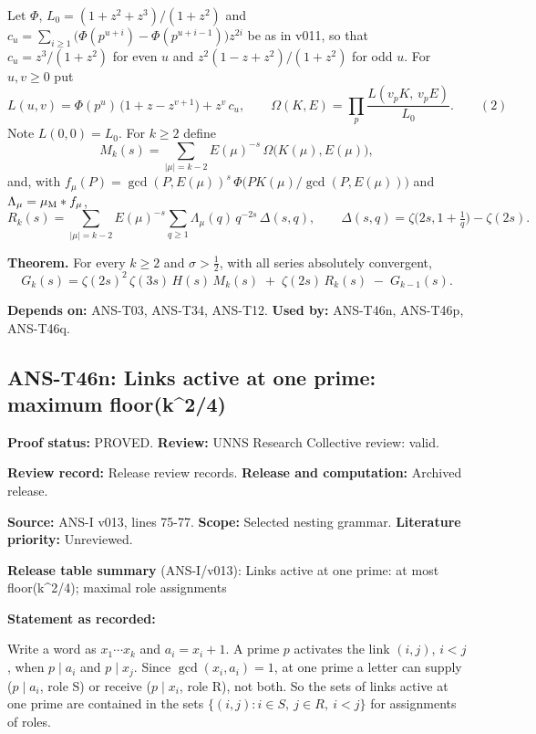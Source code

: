 \documentclass[
  11pt,
]{article}
\begin{document}
Let \(\Phi\), \(L_0=(1+z^2+z^3)/(1+z^2)\) and
\(c_u=\sum_{i\ge1}\big(\Phi(p^{u+i})-\Phi(p^{u+i-1})\big)z^{2i}\) be as
in v011, so that \(c_u=z^3/(1+z^2)\) for even \(u\) and
\(z^2(1-z+z^2)/(1+z^2)\) for odd \(u\). For \(u,v\ge0\) put
\[L(u,v)=\Phi(p^u)\,\big(1+z-z^{v+1}\big)+z^v\,c_u,\qquad\Omega(K,E)=\prod_p\frac{L(v_pK,\,v_pE)}{L_0}.\qquad(2)\]
Note \(L(0,0)=L_0\). For \(k\ge2\) define
\[M_k(s)=\sum_{|\mu|=k-2}E(\mu)^{-s}\,\Omega\big(K(\mu),E(\mu)\big),\]
and, with
\(f_\mu(P)=\gcd(P,E(\mu))^s\,\Phi\big(PK(\mu)/\gcd(P,E(\mu))\big)\) and
\(\Lambda_\mu=\mu_{\rm M}*f_\mu\),
\[R_k(s)=\sum_{|\mu|=k-2}E(\mu)^{-s}\sum_{q\ge1}\Lambda_\mu(q)\,q^{-2s}\,\Delta(s,q),\qquad\Delta(s,q)=\zeta\big(2s,1+\tfrac1q\big)-\zeta(2s).\]

\textbf{Theorem.} For every \(k\ge2\) and \(\sigma>\frac12\), with all
series absolutely convergent,
\[\boxed{\,G_k(s)=\zeta(2s)^2\,\zeta(3s)\,H(s)\,M_k(s)\;+\;\zeta(2s)\,R_k(s)\;-\;G_{k-1}(s).\,}\]

\textbf{Depends on:} ANS-T03, ANS-T34, ANS-T12. \textbf{Used by:}
ANS-T46n, ANS-T46p, ANS-T46q.

\hypertarget{ans-t46n-links-active-at-one-prime-maximum-floork24}{%
\subsection{ANS-T46n: Links active at one prime: maximum
floor(k\^{}2/4)}\label{ans-t46n-links-active-at-one-prime-maximum-floork24}}

\textbf{Proof status:} PROVED. \textbf{Review:} UNNS Research Collective
review: valid.

\textbf{Review record:} Release review records. \textbf{Release and
computation:} Archived release.

\textbf{Source:} ANS-I v013, lines 75-77. \textbf{Scope:} Selected
nesting grammar. \textbf{Literature priority:} Unreviewed.

\textbf{Release table summary} (ANS-I/v013): Links active at one prime:
at most floor(k\^{}2/4); maximal role assignments

\textbf{Statement as recorded:}

Write a word as \(x_1\cdots x_k\) and \(a_i=x_i+1\). A prime \(p\)
activates the link \((i,j)\), \(i<j\), when \(p\mid a_i\) and
\(p\mid x_j\). Since \(\gcd(x_i,a_i)=1\), at one prime a letter can
supply (\(p\mid a_i\), role S) or receive (\(p\mid x_i\), role R), not
both. So the sets of links active at one prime are contained in the sets
\(\{(i,j):i\in S,\ j\in R,\ i<j\}\) for assignments of roles.
\end{document}
